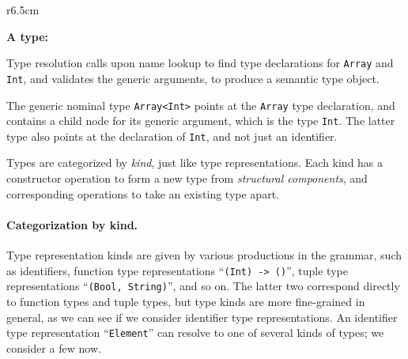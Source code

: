 \documentclass[../generics]{subfiles}
\begin{document}
\medskip

\begin{wrapfigure}[13]{r}{6.5cm}
\begin{center}
\textbf{A type:}
\end{center}
\end{wrapfigure}

Type resolution calls upon name lookup to find type declarations for \texttt{Array} and \texttt{Int}, and validates the generic arguments, to produce a semantic type object.

The generic nominal type \texttt{Array<Int>} points at the \texttt{Array} type declaration, and contains a child node for its generic argument, which is the type \texttt{Int}. The latter type also points at the declaration of \texttt{Int}, and not just an identifier.

Types are categorized by \emph{kind}, just like type representations. Each kind has a constructor operation to form a new type from \emph{structural components}, and corresponding operations to take an existing type apart.

\paragraph{Categorization by kind.}
Type representation kinds are given by various productions in the grammar, such as identifiers, function type representations ``\texttt{(Int) -> ()}'', tuple type representations ``\texttt{(Bool, String)}'', and so on. The latter two correspond directly to function types and tuple types, but type kinds are more fine-grained in general, as we can see if we consider identifier type representations. An identifier type representation ``\texttt{Element}'' can resolve to one of several kinds of types; we consider a few now.
\end{document}
